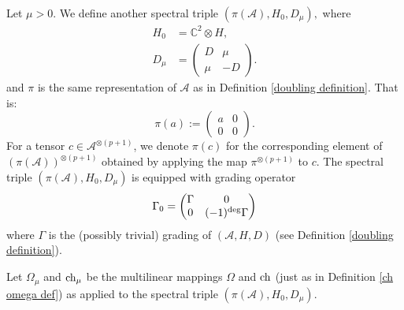    Let $\mu >0.$ We define another spectral triple $(\pi(\mathcal{A}),H_0,D_{\mu}),$ where
    \begin{align*}
          H_0 &= \mathbb{C}^2\otimes H,\\
        D_\mu &= \begin{pmatrix} D & \mu \\ \mu & -D\end{pmatrix}.
    \end{align*}
    and $\pi$ is the same representation of $\mathcal{A}$ as in Definition \ref{doubling definition}. That is:
    \begin{equation*}
        \pi(a) := \begin{pmatrix} a & 0 \\ 0 & 0\end{pmatrix}.
    \end{equation*}
    For a tensor $c \in \mathcal{A}^{\otimes (p+1)}$, we denote $\pi(c)$ for the corresponding element of $(\pi(\mathcal{A}))^{\otimes (p+1)}$ obtained by applying the map $\pi^{\otimes (p+1)}$ to $c$.
    The spectral triple $(\pi(\mathcal{A}),H_0,D_{\mu})$ is equipped with grading operator
    $$\Gamma_0=\begin{pmatrix} \Gamma & 0 \\ 0 & (-1)^{\rm deg}\Gamma\end{pmatrix}$$
    where $\Gamma$ is the (possibly trivial) grading of $(\mathcal{A},H,D)$ (see Definition \ref{doubling definition}).
        
    Let $\Omega_{\mu}$ and ${\rm ch}_{\mu}$ be the multilinear mappings $\Omega$ and ${\rm ch}$ (just as in Definition \ref{ch omega def}) as applied to the spectral triple $(\pi(\mathcal{A}),H_0,D_{\mu}).$
    
